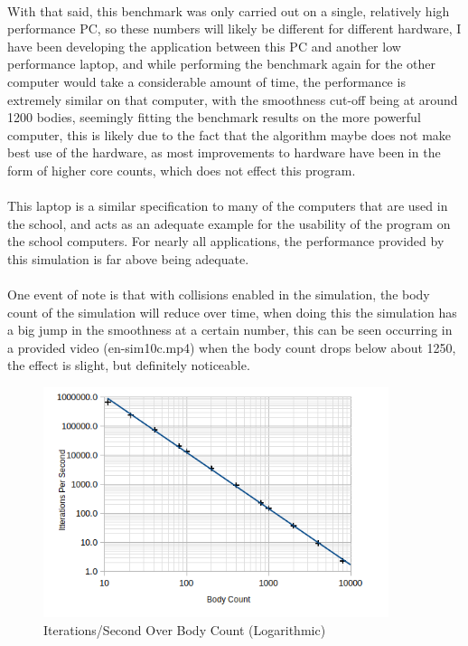 \paragraph{}
With that said, this benchmark was only carried out on a single, relatively high performance PC, so these numbers will likely be different for different hardware, I have been developing the application between this PC and another low performance laptop, and while performing the benchmark again for the other computer would take a considerable amount of time, the performance is extremely similar on that computer, with the smoothness cut-off being at around 1200 bodies, seemingly fitting the benchmark results on the more powerful computer, this is likely due to the fact that the algorithm maybe does not make best use of the hardware, as most improvements to hardware have been in the form of higher core counts, which does not effect this program.

\paragraph{}
This laptop is a similar specification to many of the computers that are used in the school, and acts as an adequate example for the usability of the program on the school computers. For nearly all applications, the performance provided by this simulation is far above being adequate.

\paragraph{}
One event of note is that with collisions enabled in the simulation, the body count of the simulation will reduce over time, when doing this the simulation has a big jump in the smoothness at a certain number, this can be seen occurring in a provided video (en-sim10c.mp4) when the body count drops below about 1250, the effect is slight, but definitely noticeable.

\begin{figure}[ht]
  \centering
  \includegraphics[width=0.9\textwidth]{img/testingEvidence/perfgraph1.png}
  \caption{Iterations/Second Over Body Count (Logarithmic)}
\end{figure}

